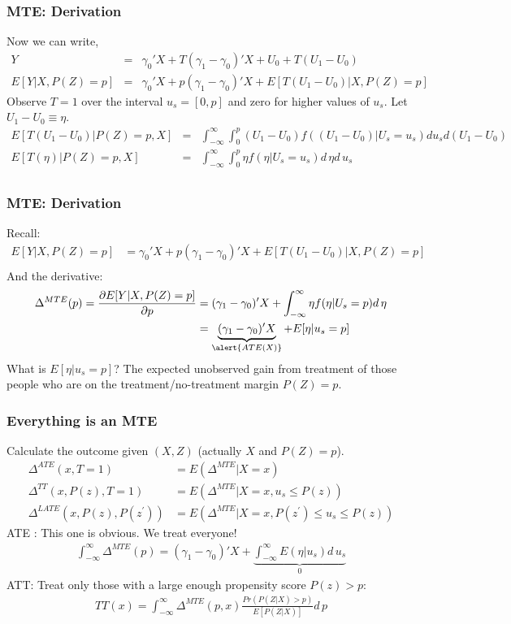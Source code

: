 \documentclass[xcolor=pdftex,dvipsnames,table,mathserif,aspectratio=169]{beamer}
\begin{document}
\begin{frame}
\frametitle{MTE: Derivation}
\footnotesize
Now we can write,
\begin{eqnarray*}
Y &=& \gamma_0' X + T(\gamma_1 - \gamma_0)' X + U_0 + T(U_1 - U_0)\\
E[Y| X,P(Z)=p] &=& \gamma_0' X + p(\gamma_1 - \gamma_0)'X + E[T(U_1 - U_0)|X,P(Z)=p]
\end{eqnarray*}
Observe $T=1$ over the interval $u_s = [0,p]$ and zero for higher values of $u_s$. Let $U_1-U_0 \equiv \eta$.
\begin{eqnarray*}
E[T(U_1 - U_0) | P(Z) =p,X] &=& \int_{-\infty}^{\infty} \int_{0}^{p} (U_1 - U_0) f((U_1-U_0) | U_s = u_s) d u_s d(U_1 -U_0)\\
E[T(\eta) | P(Z) =p,X] &=& \int_{-\infty}^{\infty} \int_{0}^{p} \eta f(\eta | U_s = u_s)  d\, \eta d\, u_s\\
\end{eqnarray*}
\end{frame}


\begin{frame}
\frametitle{MTE: Derivation}
Recall:
\begin{align*}
E[Y| X,P(Z)=p] &= \gamma_0' X + p(\gamma_1 - \gamma_0)'X + E[T(U_1 - U_0)|X,P(Z)=p]\\
\end{align*}
And the derivative:
\begin{align*}
\Delta^{MTE}(p) = \frac{\partial E[Y | X, P(Z)=p]}{\partial p} &= (\gamma_1 - \gamma_0)'X + \int_{-\infty}^{\infty} \eta f(\eta | U_s =p) d\, \eta\\
&= \underbrace{(\gamma_1 - \gamma_0)'X}_{\alert{ATE(X)}}+ E[\eta | u_s =p]
\end{align*}
What is $E[\eta | u_s =p]$? The expected unobserved gain from treatment of those people who are on the treatment/no-treatment margin $P(Z)=p$.
\end{frame}

\begin{frame}
\footnotesize
\frametitle{Everything is an MTE}
Calculate the outcome given $(X,Z)$ (actually $X$ and $P(Z)=p$).
\begin{align*}
\Delta^{ATE}(x, T=1)&=E\left(\Delta^{MTE} | X=x \right)\\
\Delta^{T T}(x, P(z), T=1)&=E\left(\Delta^{MTE} | X=x, u_{s} \leq P(z)\right)\\
\Delta^{L A T E}\left(x, P(z), P\left(z^{\prime}\right)\right)&=E\left(\Delta^{MTE} | X=x, P\left(z^{\prime}\right) \leq u_s \leq P(z)\right)
\end{align*}
ATE : This one is obvious. We treat everyone!
\begin{eqnarray*}
\int_{-\infty}^{\infty} \Delta^{MTE}(p) = (\gamma_1 - \gamma_0)'X + \underbrace{\int_{-\infty}^{\infty} E(\eta | u_s) d\, u_s}_{0}
\end{eqnarray*}
ATT: Treat only those with a large enough propensity score $P(z)>p$:
\begin{eqnarray*}
TT(x)=\int_{-\infty}^{\infty} \Delta^{MTE}(p,x) \frac{Pr(P(Z | X) > p)}{E[P(Z | X)]} d\,p
\end{eqnarray*}
\end{frame}
\end{document}
